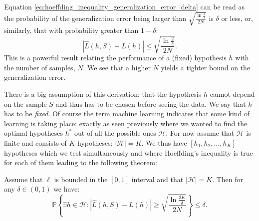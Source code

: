 Equation \eqref{eq:hoeffding_inequality_generalization_error_delta} can be read as the probability of the generalization error being larger than $\sqrt{\frac{\ln \frac{2}{\delta}}{2N}}$ is $\delta$ or less, or, similarly, that with probability greater than $1-\delta$:
\begin{equation}
  \label{eq:hoeffding_inequality_single_PAC}
  \left| \hat{L}(h, S) - L(h) \right| \leq \sqrt{\frac{\ln \frac{2}{\delta}}{2N}}.
\end{equation}
This is a powerful result relating the performance of a (fixed) hypothesis $h$ with the number of samples, $N$. We see that a higher $N$ yields a tighter bound on the generalization error.

There is a big assumption of this derivation: that the hypothesis $h$ cannot depend on the sample $S$ and thus has to be chosen before seeing the data. We say that $h$ has to be \emph{fixed}. Of course the term machine learning indicates that some kind of learning is taking place: exactly as seen previously where we wanted to find the optimal hypotheses $h^*$ out of all the possible ones $\mathcal{H}$. For now assume that $\mathcal{H}$ is finite and consists of $K$ hypotheses: $|\mathcal{H}| = K$. We thus have $[h_1, h_2, \dots, h_K]$ hypotheses which we test simultaneously and where Hoeffding's inequality is true for each of them leading to the following theorem:
\begin{theorem}
  \label{theorem:hoeffding_finite}
  Assume that $\ell$ is bounded in the $[0, 1]$ interval and that $|\mathcal{H}| = K$. Then for any $\delta\in(0,1)$ we have:  
  \begin{equation}
    \label{eq:hoeffding_inequality_theorem_multiple}
    \mathbb{P} \left\{ \exists h \in \mathcal{H}: \left| \hat{L}(h, S) - L(h) \right| \geq \sqrt{\frac{\ln \frac{2K}{\delta}}{2N}}  \right\} \leq \delta.
  \end{equation}
\end{theorem}


